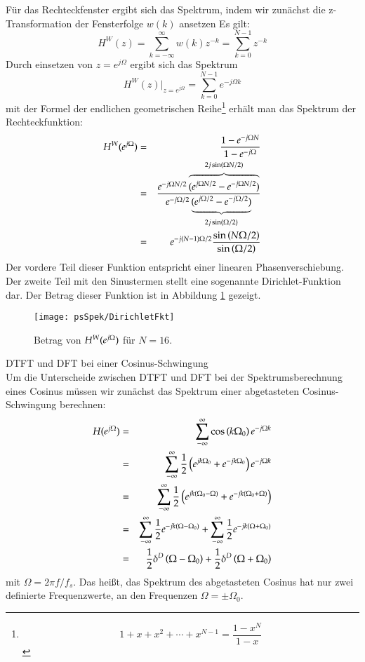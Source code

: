 Für das Rechteckfenster ergibt sich das Spektrum, indem
wir zunächst die z-Transformation der Fensterfolge $w(k)$ ansetzen
Es gilt:
\[
    H^{W}(z) = \sum_{k = -\infty}^{\infty} w(k) z^{-k} = \sum_{k = 0}^{N-1} z^{-k}
\]
Durch einsetzen von $z = e^{j\Omega}$ ergibt sich das Spektrum
\[
    H^{W}(z)\Big|_{z = e^{j\Omega}} = \sum_{k = 0}^{N-1} e^{-j\Omega k}
\]
mit der Formel der endlichen geometrischen Reihe\footnote{
\[
    1+x + x^2 + \cdots + x^{N-1} = \frac{1-x^N}{1-x}
\]}
erhält man das Spektrum der Rechteckfunktion:
\begin{eqnarray}
    H^{W}(e^{j\Omega}) & = & \frac{1-e^{-j\Omega N}}{1- e^{-j\Omega}}\\
    & = & \frac{e^{-j\Omega N/2} \overbrace{(e^{j\Omega N/2}- e^{-j\Omega N/2})}^{2j\sin(\Omega N/2)}}
    {e^{-j \Omega/2}\underbrace{(e^{j \Omega/2}- e^{-j\Omega/2})}_{2j\sin(\Omega/2)}}\\
    & = & e^{-j(N-1)\Omega/2}\frac{\sin\left(N \Omega/2
\right)}{\sin\left(\Omega/2 \right)}
\end{eqnarray}
Der vordere Teil dieser Funktion entspricht einer linearen
Phasenverschiebung. Der zweite Teil mit den Sinustermen stellt
eine sogenannte Dirichlet-Funktion dar. Der Betrag dieser Funktion ist in
Abbildung \ref{pic:DirichletFkt} gezeigt.

\begin{figure}[H]
\begin{center}
\texttt{[image: psSpek/DirichletFkt]}
\caption{\label{pic:DirichletFkt}Betrag von $H^{W}(e^{j\Omega})$ für $N = 16$.}
\end{center}
\end{figure}

\begin{example}
DTFT und DFT bei einer Cosinus-Schwingung\\
Um die Unterscheide zwischen DTFT und DFT bei der Spektrumsberechnung
eines Cosinus müssen wir zunächst das Spektrum einer abgetasteten Cosinus-Schwingung berechnen:
\begin{eqnarray}
H (e^{j\Omega}) & = & \sum_{-\infty}^{\infty} \cos \left(k \Omega_0  \right) e^{-j\Omega k}\\
       & = & \sum_{-\infty}^{\infty} \frac{1}{2}\left( e^{j k \Omega_0} + e^{-j k \Omega_0}\right) e^{-j\Omega k}\\
       & = & \sum_{-\infty}^{\infty} \frac{1}{2} \left( e^{j k (\Omega_0-\Omega)} + e^{-j k (\Omega_0 + \Omega)}\right)\\
       & = & \sum_{-\infty}^{\infty} \frac{1}{2} e^{-j k (\Omega-\Omega_0)}
       + \sum_{-\infty}^{\infty} \frac{1}{2} e^{-j k (\Omega + \Omega_0)}\\
       & = & \frac{1}{2} \delta^D \left( \Omega - \Omega_0 \right)
       + \frac{1}{2} \delta^D \left( \Omega + \Omega_0 \right)
\end{eqnarray}
mit $\Omega = 2\pi f / f_s$.
Das heißt, das Spektrum des abgetasteten Cosinus hat nur zwei definierte
Frequenzwerte, an den Frequenzen $\Omega = \pm \Omega_0$.
\end{example}

